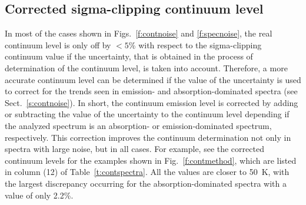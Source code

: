 \documentclass{aa}
\begin{document}
\subsection{Corrected sigma-clipping continuum level}\label{s:correction}

In most of the cases shown in Figs.~\ref{f:contnoise} and \ref{f:specnoise}, the real continuum level is only off by $<5$\% with respect to the sigma-clipping continuum value if the uncertainty, that is obtained in the process of determination of the continuum level, is taken into account. Therefore, a more accurate continuum level can be determined if the value of the uncertainty is used to correct for the trends seen in emission- and absorption-dominated spectra (see Sect.~\ref{s:contnoise}). In short, the continuum emission level is corrected by adding or subtracting the value of the uncertainty to the continuum level depending if the analyzed spectrum is an absorption- or emission-dominated spectrum, respectively. This correction improves the continuum determination not only in spectra with large noise, but in all cases. For example, see the corrected continuum levels for the examples shown in Fig.~\ref{f:contmethod}, which are listed in column (12) of Table~\ref{t:contspectra}. All the values are closer to 50~K, with the largest discrepancy occurring for the absorption-dominated spectra with a value of only 2.2\%.
\end{document}
